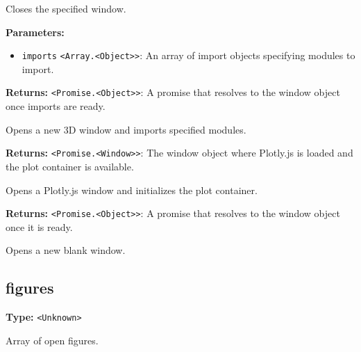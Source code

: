 \documentclass[12pt,a4paper]{article}
\begin{document}
\noindent Closes the specified window.

\vspace{5mm}
\noindent {}


\noindent \textbf{Parameters:}
\begin{itemize}
  \item \texttt{imports} \texttt{<Array.<Object>>}: An array of import objects specifying modules to import.
\end{itemize}

\noindent \textbf{Returns:} \texttt{<Promise.<Object>>}: A promise that resolves to the window object once imports are ready.

\noindent Opens a new 3D window and imports specified modules.

\vspace{5mm}
\noindent {}


\noindent \textbf{Returns:} \texttt{<Promise.<Window>>}: The window object where Plotly.js is loaded and the plot container is available.

\noindent Opens a Plotly.js window and initializes the plot container.

\vspace{5mm}
\noindent {}


\noindent \textbf{Returns:} \texttt{<Promise.<Object>>}: A promise that resolves to the window object once it is ready.

\noindent Opens a new blank window.


\subsection{figures}
\vspace{5mm}
\noindent {}\vspace{4mm}


\noindent \textbf{Type:} \texttt{<Unknown>}

\noindent Array of open figures.
\end{document}
